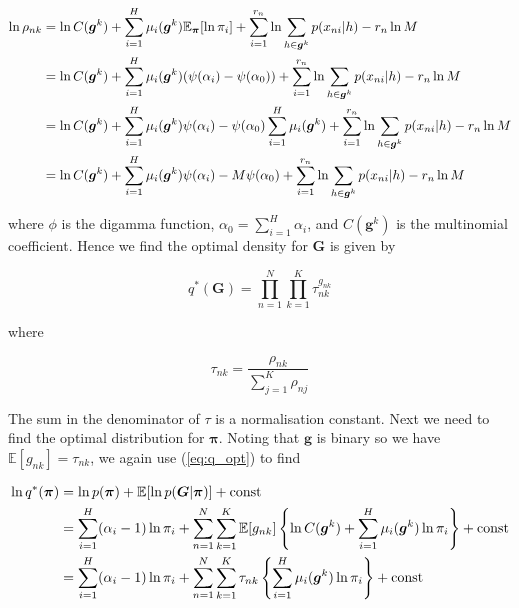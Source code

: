 \documentclass{article}
\begin{document}
\begin{align}
    \ln \rho_{nk} &= \ln C(\boldsymbol{g}^k) + \sum_{i = 1}^H \mu_i(\boldsymbol{g}^k) \mathbb{E}_{\boldsymbol{\pi}}[\ln \pi_i] + \sum_{i = 1}^{r_n} \ln \sum_{h \in \boldsymbol{g}^k} p(x_{ni} | h) - r_n \ln M \notag \\
    &= \ln C(\boldsymbol{g}^k) + \sum_{i = 1}^H \mu_i(\boldsymbol{g}^k) (\psi(\alpha_i) - \psi(\alpha_0)) + \sum_{i = 1}^{r_n} \ln \sum_{h \in \boldsymbol{g}^k} p(x_{ni} | h) - r_n \ln M \notag \\
    &= \ln C(\boldsymbol{g}^k) + \sum_{i = 1}^H \mu_i(\boldsymbol{g}^k) \psi(\alpha_i) - \psi(\alpha_0)\sum_{i = 1}^H \mu_i(\boldsymbol{g}^k) + \sum_{i = 1}^{r_n} \ln \sum_{h \in \boldsymbol{g}^k} p(x_{ni} | h) - r_n \ln M\notag\\
    &= \ln C(\boldsymbol{g}^k) + \sum_{i = 1}^H \mu_i(\boldsymbol{g}^k) \psi(\alpha_i) - M\psi(\alpha_0) + \sum_{i = 1}^{r_n} \ln \sum_{h \in \boldsymbol{g}^k} p(x_{ni} | h) - r_n \ln M
\end{align}

where $\phi$ is the digamma function, $\alpha_0 = \sum_{i = 1}^H \alpha_i$, and $C(\boldsymbol{g}^k)$ is the multinomial coefficient. Hence we find the optimal density for $\boldsymbol{G}$ is given by

\begin{equation}
q^*(\boldsymbol{G}) = \prod_{n = 1}^N \prod_{k = 1}^K \tau_{nk}^{g_{nk}}
\end{equation}

where

\begin{equation}
\label{eq:sg_pp}
\tau_{nk} = \frac{\rho_{nk}}{\sum_{j = 1}^K \rho_{nj}}
\end{equation}

The sum in the denominator of $\tau$ is a normalisation constant. Next we need to find the optimal distribution for $\boldsymbol{\pi}$. Noting that $\boldsymbol{g}$ is binary so we have $ \mathbb{E}[g_{nk}] = \tau_{nk}$, we again use (\ref{eq:q_opt}) to find

\begin{align}
    \ln q^*(\boldsymbol{\pi}) &= \ln p(\boldsymbol{\pi}) + \mathbb{E}[\ln p(\boldsymbol{G} | \boldsymbol{\pi})] + \text{const}\notag\\
    &= \sum_{i = 1}^H (\alpha_i - 1) \ln \pi_i + \sum_{n = 1}^N \sum_{k = 1}^K \mathbb{E}[g_{nk}]\left\{ \ln C(\boldsymbol{g}^k) + \sum_{i = 1}^H \mu_i(\boldsymbol{g}^k) \ln \pi_i \right\} + \text{const} \notag\\
    &= \sum_{i = 1}^H (\alpha_i - 1) \ln \pi_i + \sum_{n = 1}^N \sum_{k = 1}^K \tau_{nk} \left\{ \sum_{i = 1}^H \mu_i(\boldsymbol{g}^k) \ln \pi_i \right\} + \text{const}
\end{align}
\end{document}
